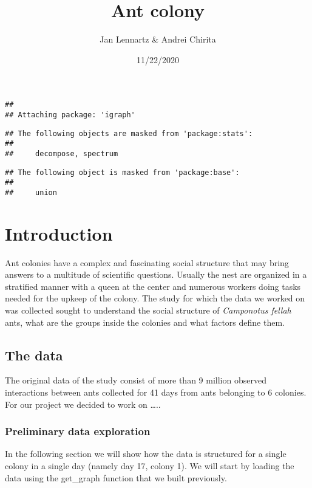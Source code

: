 \documentclass[
]{article}
\title{Ant colony}
\author{Jan Lennartz \& Andrei Chirita}
\date{11/22/2020}
\begin{document}
\maketitle

\begin{verbatim}
## 
## Attaching package: 'igraph'
\end{verbatim}

\begin{verbatim}
## The following objects are masked from 'package:stats':
## 
##     decompose, spectrum
\end{verbatim}

\begin{verbatim}
## The following object is masked from 'package:base':
## 
##     union
\end{verbatim}

\newpage
\tableofcontents
\newpage

\hypertarget{introduction}{%
\section{Introduction}\label{introduction}}

Ant colonies have a complex and fascinating social structure that may
bring answers to a multitude of scientific questions. Usually the nest
are organized in a stratified manner with a queen at the center and
numerous workers doing tasks needed for the upkeep of the colony. The
study for which the data we worked on was collected sought to understand
the social structure of \emph{Camponotus fellah} ants, what are the
groups inside the colonies and what factors define them.

\hypertarget{the-data}{%
\subsection{The data}\label{the-data}}

The original data of the study consist of more than 9 million observed
interactions between ants collected for 41 days from ants belonging to 6
colonies. For our project we decided to work on \ldots..

\hypertarget{preliminary-data-exploration}{%
\subsubsection{Preliminary data
exploration}\label{preliminary-data-exploration}}

In the following section we will show how the data is structured for a
single colony in a single day (namely day 17, colony 1). We will start
by loading the data using the get\_graph function that we built
previously.
\end{document}

